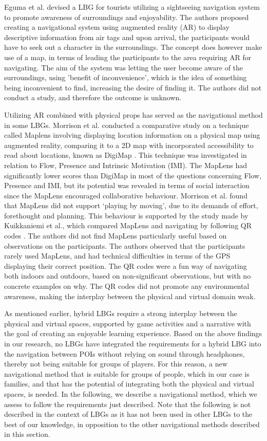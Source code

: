 Eguma et al. devised a LBG for tourists utilizing a sightseeing navigation system to promote awareness of surroundings and enjoyability\cite{HideAndSeek}. The authors proposed creating a navigational system using augmented reality (AR) to display descriptive information from air tags and upon arrival, the participants would have to seek out a character in the surroundings. The concept does however make use of a map, in terms of leading the participants to the area requiring AR for navigating. The aim of the system was letting the user become aware of the surroundings, using 'benefit of inconvenience', which is the idea of something being inconvenient to find, increasing the desire of finding it. The authors did not conduct a study, and therefore the outcome is unknown.

Utilizing AR combined with physical props has served as the navigational method in some LBGs. Morrison et al. conducted a comparative study on a technique called Maplens involving displaying location information on a physical map using augmented reality, comparing it to a 2D map with incorporated accessibility to read about locations, known as DigiMap \cite{Morrison}. This technique was investigated in relation to Flow, Presence and Intrinsic Motivation (IMI). The MapLens had significantly lower scores than DigiMap in most of the questions concerning Flow, Presence and IMI, but its potential was revealed in terms of social interaction since the MapLens encouraged collaborative behaviour.  Morrison et al. found that MapLens did not support ‘playing by moving’, due to its demands of effort, forethought and planning. This behaviour is supported by the study made by Kuikkaniemi et al., which compared MapLens and navigating by following QR codes \cite{LostLab}. The authors did not find MapLens particularly useful based on observations on the participants. The authors observed that the participants rarely used MapLens, and had technical difficulties in terms of the GPS displaying their correct position. The QR codes were a fun way of navigating both indoors and outdoors, based on non-significant observations, but with no concrete examples on why. The QR codes did not promote any environmental awareness, making the interplay between the physical and virtual domain weak. 

As mentioned earlier, hybrid LBGs require a strong interplay between the physical and virtual spaces, supported by game activities and a narrative with the goal of creating an enjoyable learning experience. Based on the above findings in our research, no LBGs have integrated the requirements for a hybrid LBG into the navigation between POIs without relying on sound through headphones, thereby not being suitable for groups of players. For this reason, a new navigational method that is suitable for groups of people, which in our case is families, and that has the potential of integrating both the physical and virtual spaces, is needed. In the following, we describe a navigational method, which we assess to follow the requirements just described. Note that the following is not described in the context of LBGs as it has not been used in other LBGs to the best of our knowledge, in opposition to the other navigational methods described in this section.


